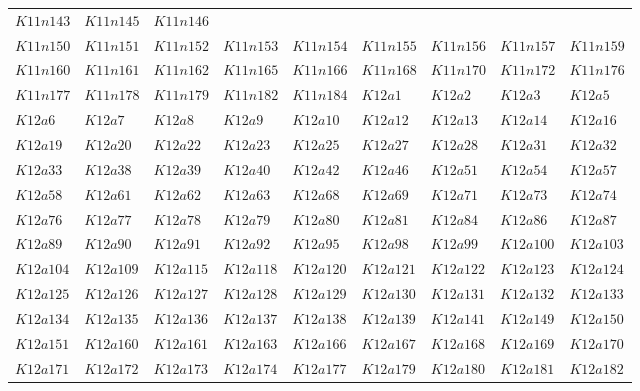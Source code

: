 \documentclass{amsart} %
\theoremstyle{thm}
\theoremstyle{definition}
\numberwithin{equation}{section}
\begin{document}
{\begin{longtable}{@{}lllllllll@{}}
  $K11n143$ &  
  $K11n145$ &  
  $K11n146$ \\   
  $K11n150$ &  
  $K11n151$ &  
  $K11n152$ &  
  $K11n153$ &  
  $K11n154$ &  
  $K11n155$ &  
  $K11n156$ &  
  $K11n157$ &  
  $K11n159$ \\   
  $K11n160$ &  
  $K11n161$ &  
  $K11n162$ &  
  $K11n165$ &  
  $K11n166$ &  
  $K11n168$ &  
  $K11n170$ &  
  $K11n172$ &  
  $K11n176$ \\   
  $K11n177$ &  
  $K11n178$ &  
  $K11n179$ &  
  $K11n182$ &  
  $K11n184$ &  
  $K12a1$ &  
  $K12a2$ &  
  $K12a3$ &  
  $K12a5$ \\   
  $K12a6$ &  
  $K12a7$ &  
  $K12a8$ &  
  $K12a9$ &  
  $K12a10$ &  
  $K12a12$ &  
  $K12a13$ &  
  $K12a14$ &  
  $K12a16$ \\  
  $K12a19$ &  
  $K12a20$ &  
  $K12a22$ &  
  $K12a23$ &  
  $K12a25$ &  
  $K12a27$ &  
  $K12a28$ &  
  $K12a31$ &  
  $K12a32$ \\   
  $K12a33$ &  
  $K12a38$ &  
  $K12a39$ &  
  $K12a40$ &  
  $K12a42$ &  
  $K12a46$ &  
  $K12a51$ &  
  $K12a54$ &  
  $K12a57$ \\  
  $K12a58$ &  
  $K12a61$ &  
  $K12a62$ &  
  $K12a63$ &  
  $K12a68$ &  
  $K12a69$ &  
  $K12a71$ &  
  $K12a73$ &  
  $K12a74$ \\  
  $K12a76$ &  
  $K12a77$ &  
  $K12a78$ &  
  $K12a79$ &  
  $K12a80$ &  
  $K12a81$ &  
  $K12a84$ &  
  $K12a86$ &  
  $K12a87$ \\   
  $K12a89$ &  
  $K12a90$ &  
  $K12a91$ &  
  $K12a92$ &  
  $K12a95$ &  
  $K12a98$ &  
  $K12a99$ &  
  $K12a100$ &  
  $K12a103$ \\  
  $K12a104$ &  
  $K12a109$ &  
  $K12a115$ &  
  $K12a118$ &  
  $K12a120$ &  
  $K12a121$ &  
  $K12a122$ &  
  $K12a123$ &  
  $K12a124$ \\   
  $K12a125$ &  
  $K12a126$ &  
  $K12a127$ &  
  $K12a128$ &  
  $K12a129$ &  
  $K12a130$ &  
  $K12a131$ &  
  $K12a132$ &  
  $K12a133$ \\   
  $K12a134$ &  
  $K12a135$ &  
  $K12a136$ &  
  $K12a137$ &  
  $K12a138$ &  
  $K12a139$ &  
  $K12a141$ &  
  $K12a149$ &  
  $K12a150$ \\   
  $K12a151$ &  
  $K12a160$ &  
  $K12a161$ &  
  $K12a163$ &  
  $K12a166$ &  
  $K12a167$ &  
  $K12a168$ &  
  $K12a169$ &  
  $K12a170$ \\   
  $K12a171$ &  
  $K12a172$ &  
  $K12a173$ &  
  $K12a174$ &  
  $K12a177$ &  
  $K12a179$ &  
  $K12a180$ &  
  $K12a181$ &  
  $K12a182$ \\   

\end{longtable}}
\end{document}
